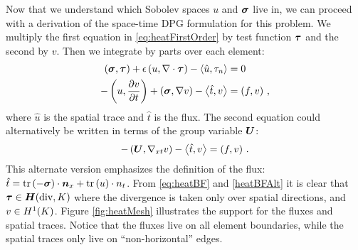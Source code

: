 \documentclass[Proposal.tex]{subfiles}
\begin{document}
Now that we understand which Sobolev spaces $u$ and $\boldsymbol\sigma$ live in, we can proceed with a derivation of the space-time DPG formulation for this problem.
We multiply the first equation in \eqref{eq:heatFirstOrder} by test function $\boldsymbol\tau$ and the second by $v$. Then we integrate by parts over each element:
\begin{equation}
\label{eq:heatBF}
	\begin{aligned}
		\left( \boldsymbol\sigma,\boldsymbol\tau \right)+\epsilon\left( u,\nabla\cdot\boldsymbol\tau \right)-\left\langle \hat u,\tau_n \right\rangle&=0\\
		-\left( u,\frac{\partial v}{\partial t} \right)+\left( \boldsymbol\sigma,\nabla v \right)-\left\langle \hat t,v \right\rangle&=\left( f,v \right)\,,
	\end{aligned}
\end{equation}
where $\hat u$ is the spatial trace and $\hat t$ is the flux.
The second equation could alternatively be written in terms of the group variable $\boldsymbol U$:
\begin{equation}
\label{heatBFAlt}
-\left( \boldsymbol U,\nabla_{xt} v \right)-\left\langle \hat t,v \right\rangle=\left( f,v \right)\,.
\end{equation}
This alternate version emphasizes the definition of the flux: $\hat t=\operatorname*{tr}\left( -\boldsymbol\sigma \right)\cdot\boldsymbol n_x+\operatorname*{tr}{(u)}\cdot n_t$.
From \eqref{eq:heatBF} and \eqref{heatBFAlt} it is clear that $\boldsymbol\tau\in\mbox{\boldmath $H$}(\text{div},K)$ where the divergence is taken only over spatial directions, and $v\in H^{1}(K)$.
Figure \ref{fig:heatMesh} illustrates the support for the fluxes and spatial traces. Notice that the fluxes live on all element boundaries, while the spatial traces only live on ``non-horizontal'' edges.
\end{document}
